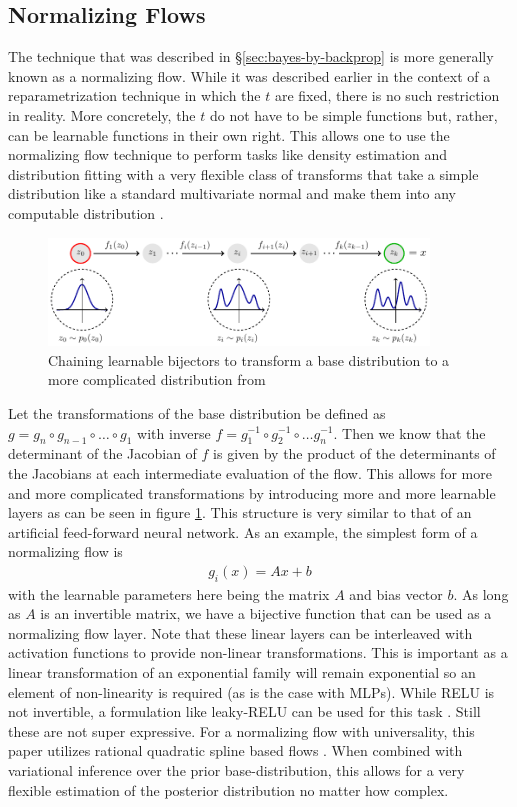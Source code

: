 \subsection{Normalizing Flows}
The technique that was described in \S\ref{sec:bayes-by-backprop} is more generally known as a normalizing flow. While it was described earlier in the context of a reparametrization technique in which the $t$ are fixed, there is no such restriction in reality. More concretely, the $t$ do not have to be simple functions but, rather, can be learnable functions in their own right. This allows one to use the normalizing flow technique to perform tasks like density estimation and distribution fitting with a very flexible class of transforms that take a simple distribution like a standard multivariate normal and make them into any computable distribution \cite{kobyzev_normalizing_2021}.
\begin{figure}[t]
  \centering
  \includegraphics[width=0.9\textwidth]{images/nf.pdf}
  \caption{Chaining learnable bijectors to transform a base distribution to a more complicated distribution from \cite{weng_flow-based_2018}}
  \label{fig:nf}
\end{figure}
Let the transformations of the base distribution be defined as $g = g_n \circ g_{n-1} \circ \dots \circ g_1$ with inverse $f = g_1^{-1} \circ g_2^{-1} \circ \dots g_n^{-1}$. Then we know that the determinant of the Jacobian of $f$ is given by the product of the determinants of the Jacobians at each intermediate evaluation of the flow. This allows for more and more complicated transformations by introducing more and more learnable layers as can be seen in figure \ref{fig:nf}. This structure is very similar to that of an artificial feed-forward neural network. As an example, the simplest form of a normalizing flow is
\begin{align*}
  g_i(x) = Ax + b
\end{align*}
with the learnable parameters here being the matrix $A$ and bias vector $b$. As long as $A$ is an invertible matrix, we have a bijective function that can be used as a normalizing flow layer. Note that these linear layers can be interleaved with activation functions to provide non-linear transformations. This is important as a linear transformation of an exponential family will remain exponential so an element of non-linearity is required (as is the case with MLPs). While RELU is not invertible, a formulation like leaky-RELU can be used for this task \cite{xu_empirical_2015}. Still these are not super expressive. For a normalizing flow with universality, this paper utilizes rational quadratic spline based flows \cite{durkan_neural_2019}. When combined with variational inference over the prior base-distribution, this allows for a very flexible estimation of the posterior distribution no matter how complex.
